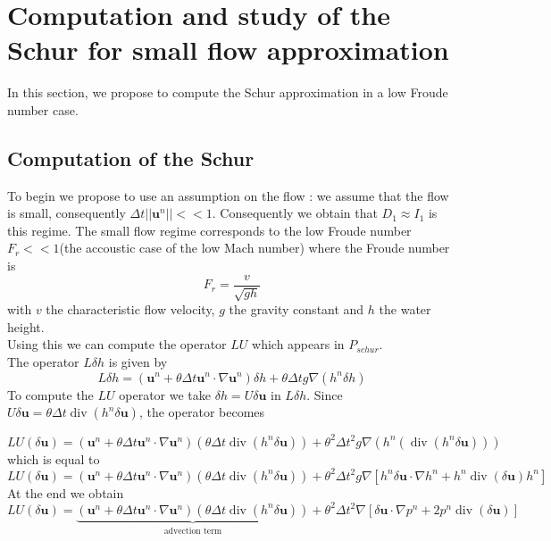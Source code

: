 \documentclass[a4paper, 11pt]{report}
\begin{document}
\section{Computation and study of the Schur for small flow approximation}

In this section, we propose to compute the Schur approximation in a low Froude number case.

\subsection{Computation of the Schur}
To begin we propose to use an assumption on the flow : we assume that the flow is small, consequently $\Delta t || \boldsymbol{u}^n|| <<1$. Consequently we obtain that $D_1\approx I_1$ is this regime. The small flow regime corresponds to the low Froude number $F_r<<1$(the accoustic case of the low Mach number) where the Froude number is \begin{equation*}
F_r=\frac{v}{\sqrt{gh}}\end{equation*} with $v$ the characteristic flow velocity, $g$ the gravity constant and $h$ the water height.\\
Using this we can compute the operator $LU$ which appears in $P_{schur}$.\\
The operator $L \delta h$ is given by
$$
L \delta h =(\boldsymbol{u}^n+\theta \Delta t \boldsymbol{u}^n\cdot \nabla \boldsymbol{u}^n )\delta h+\theta \Delta t g \nabla( h^n\delta h)
$$
To compute the $LU$ operator we take $\delta h=U\delta \boldsymbol{u}$ in $L \delta h$. Since $U\delta \boldsymbol{u}=\theta \Delta t \operatorname{div}(h^n \delta \boldsymbol{u})$, the operator becomes

\begin{equation*}
LU(\delta \boldsymbol{u})=\left(\boldsymbol{u}^n+\theta \Delta t \boldsymbol{u}^n\cdot \nabla \boldsymbol{u}^n \right)\left(\theta \Delta t \operatorname{div}(h^n \delta \boldsymbol{u})\right)
+\theta^2 \Delta t^2 g\nabla\left( h^n\left(\operatorname{div}(h^n\delta  \boldsymbol{u})\right)\right)\end{equation*}
which is equal to
\begin{equation*}
LU(\delta \boldsymbol{u})=\left(\boldsymbol{u}^n+\theta \Delta t \boldsymbol{u}^n\cdot \nabla \boldsymbol{u}^n \right)\left(\theta \Delta t \operatorname{div}(h^n \delta \boldsymbol{u})\right)
+\theta^2 \Delta t^2 g\nabla\left[ h^n \delta \boldsymbol{u}\cdot \nabla h^n + h^n \operatorname{div}(\delta \boldsymbol{u})h^n \right]\end{equation*}
At the end we obtain
\begin{equation*}
LU(\delta \boldsymbol{u})=\underbrace{\left(\boldsymbol{u}^n+\theta \Delta t \boldsymbol{u}^n\cdot \nabla \boldsymbol{u}^n \right)\left(\theta \Delta t \operatorname{div}(h^n \delta \boldsymbol{u})\right)}_{\text{advection term}}
+\theta^2 \Delta t^2 \nabla\left[ \delta \boldsymbol{u}\cdot \nabla p^n + 2p^n \operatorname{div}(\delta \boldsymbol{u}) \right]
\end{equation*}
\end{document}
